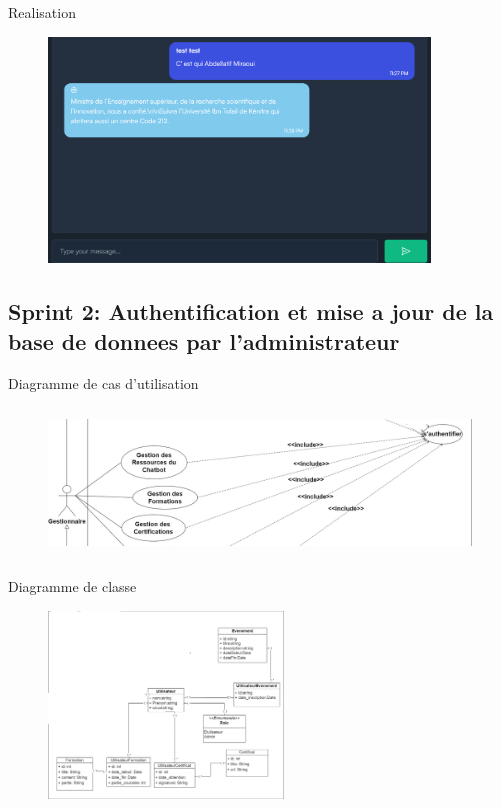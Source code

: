 \begin{frame}{Realisation}
    \begin{figure}[H]
        \centering
        \includegraphics[height=6cm]{assets/images/chat2.png}
    \end{figure}
\end{frame}


\subsection{Sprint 2: Authentification et mise a jour de la
    base de donnees par l’administrateur}
\begin{frame}{Diagramme de cas d'utilisation}

    \begin{figure}[H]
        \centering
        \includegraphics[height=4cm]{assets/images/sprint2-usecase.png}
    \end{figure}
\end{frame}

\begin{frame}{Diagramme de classe}

    \begin{figure}[H]
        \centering
        \includegraphics[height=5cm]{assets/images/sprint2-class.png}
    \end{figure}
\end{frame}


